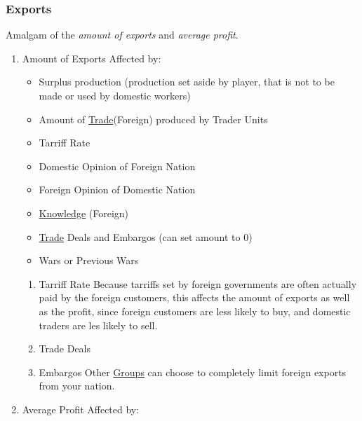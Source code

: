 \documentclass[11pt]{article}
\begin{document}
\subsubsection{Exports}
\label{sec:org5bc7c73}
Amalgam of the \emph{amount of exports} and \emph{average profit}.\\
\begin{enumerate}
\item Amount of Exports
\label{sec:org8ef61e2}
Affected by:\\
\begin{itemize}
\item Surplus production (production set aside by player, that is not to be made or used by domestic workers)\\
\item Amount of \hyperref[orgdbeaa2d]{Trade}(Foreign) produced by Trader Units\\
\item Tarriff Rate\\
\item Domestic Opinion of Foreign Nation\\
\item Foreign Opinion of Domestic Nation\\
\item \hyperref[orgd7203c2]{Knowledge} (Foreign)\\
\item \hyperref[orgdbeaa2d]{Trade} Deals and Embargos (can set amount to 0)\\
\item Wars or Previous Wars\\
\end{itemize}
\begin{enumerate}
\item Tarriff Rate
\label{sec:orgf9aab45}
Because tarriffs set by foreign governments are often actually paid by the foreign customers, this affects the amount of exports as well as the profit, since foreign customers are less likely to buy, and domestic traders are les likely to sell.\\
\item Trade Deals
\label{sec:org79b0bd2}
\item Embargos
\label{sec:orgd52faae}
Other \hyperref[org21e4d88]{Groups} can choose to completely limit foreign exports from your nation.\\
\end{enumerate}
\item Average Profit
\label{sec:org06143b9}
Affected by:\\

\end{enumerate}
\end{document}
